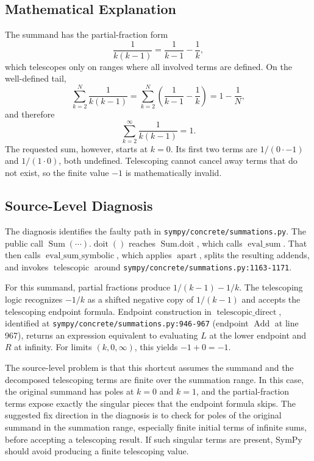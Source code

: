 \documentclass[11pt]{article}
\begin{document}
\subsection{Mathematical Explanation}

The summand has the partial-fraction form
\[
  \frac{1}{k(k-1)} = \frac{1}{k-1} - \frac{1}{k},
\]
which telescopes only on ranges where all involved terms are defined. On the well-defined tail,
\[
  \sum_{k=2}^{N} \frac{1}{k(k-1)}
  = \sum_{k=2}^{N}\left(\frac{1}{k-1} - \frac{1}{k}\right)
  = 1 - \frac{1}{N},
\]
and therefore
\[
  \sum_{k=2}^{\infty} \frac{1}{k(k-1)} = 1.
\]
The requested sum, however, starts at \(k=0\). Its first two terms are \(1/(0\cdot -1)\) and \(1/(1\cdot 0)\), both undefined. Telescoping cannot cancel away terms that do not exist, so the finite value \(-1\) is mathematically invalid.

\subsection{Source-Level Diagnosis}

The diagnosis identifies the faulty path in \nolinkurl{sympy/concrete/summations.py}. The public call \(\operatorname{Sum}(\cdots).\operatorname{doit}()\) reaches \(\operatorname{Sum.doit}\), which calls \(\operatorname{eval\_sum}\). That then calls \(\operatorname{eval\_sum\_symbolic}\), which applies \(\operatorname{apart}\), splits the resulting addends, and invokes \(\operatorname{telescopic}\) around \nolinkurl{sympy/concrete/summations.py:1163-1171}.

For this summand, partial fractions produce \(1/(k-1)-1/k\). The telescoping logic recognizes \(-1/k\) as a shifted negative copy of \(1/(k-1)\) and accepts the telescoping endpoint formula. Endpoint construction in \(\operatorname{telescopic\_direct}\), identified at \nolinkurl{sympy/concrete/summations.py:946-967} (endpoint \(\operatorname{Add}\) at line 967), returns an expression equivalent to evaluating \(L\) at the lower endpoint and \(R\) at infinity. For limits \((k,0,\infty)\), this yields \(-1+0=-1\).

The source-level problem is that this shortcut assumes the summand and the decomposed telescoping terms are finite over the summation range. In this case, the original summand has poles at \(k=0\) and \(k=1\), and the partial-fraction terms expose exactly the singular pieces that the endpoint formula skips. The suggested fix direction in the diagnosis is to check for poles of the original summand in the summation range, especially finite initial terms of infinite sums, before accepting a telescoping result. If such singular terms are present, SymPy should avoid producing a finite telescoping value.
\end{document}

